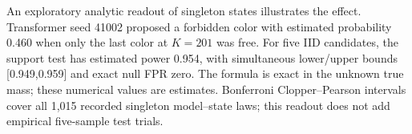 An exploratory analytic readout of singleton states illustrates the effect. Transformer seed 41002 proposed a forbidden color with estimated probability 0.460 when only the last color at $K=201$ was free. For five IID candidates, the support test has estimated power 0.954, with simultaneous lower/upper bounds [0.949,0.959] and exact null FPR zero. The formula is exact in the unknown true mass; these numerical values are estimates. Bonferroni Clopper--Pearson intervals cover all 1,015 recorded singleton model--state laws; this readout does not add empirical five-sample test trials.
